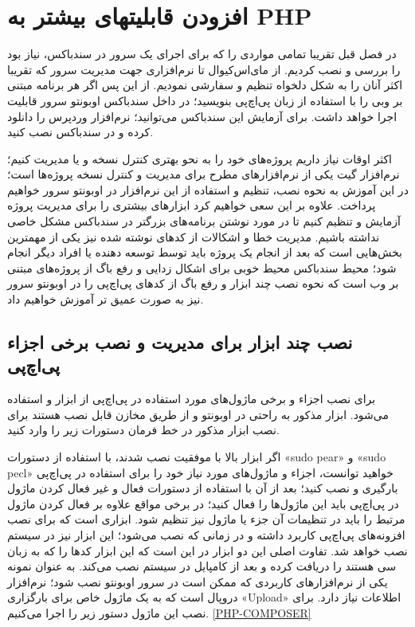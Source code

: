 \chapter{افزودن قابلیتهای بیشتر به PHP}
در فصل قبل تقریبا تمامی مواردی را که برای اجرای یک سرور در سندباکس، نیاز بود را بررسی و نصب کردیم. از مای‌اس‌کیوال تا نرم‌افزاری جهت مدیریت سرور که تقریبا اکثر آنان را به شکل دلخواه تنظیم و سفارشی نمودیم. از این پس اگر هر برنامه مبتنی بر وبی را با استفاده از زبان پی‌اچ‌پی بنویسید؛ در داخل سند‌باکس اوبونتو سرور قابلیت اجرا خواهد داشت. برای آزمایش این سندباکس می‌توانید؛ نرم‌افزار وردپرس را دانلود کرده و در سندباکس نصب کنید.

اکثر اوقات نیاز داریم پروژه‌های خود را به نحو بهتری کنترل نسخه و یا مدیریت کنیم؛ نرم‌افزار گیت یکی از نرم‌افزارهای مطرح برای مدیریت و کنترل نسخه پروژه‌ها است؛ در این آموزش به نحوه نصب، تنظیم و استفاده از این نرم‌افزار در اوبونتو سرور خواهیم پرداخت. علاوه بر این سعی خواهیم کرد ابزارهای بیشتری را برای مدیریت پروژه آزمایش و تنظیم کنیم تا در مورد نوشتن برنامه‌های بزرگتر در سندباکس مشکل خاصی نداشته باشیم. مدیریت خطا و اشکالات از کدهای نوشته شده نیز یکی از مهمترین بخش‌هایی است که بعد از انجام یک پروژه باید توسط توسعه دهنده یا افراد دیگر انجام شود؛ محیط سندباکس محیط خوبی برای اشکال زدایی و رفع باگ از پروژه‌های مبتنی بر وب است که نحوه نصب چند ابزار و رفع باگ از کدهای پی‌اچ‌پی را در اوبونتو سرور نیز به صورت عمیق تر آموزش خواهیم داد.
\section{نصب چند ابزار برای مدیریت و نصب برخی اجزاء پی‌اچ‌پی}
برای نصب اجزاء و برخی ماژول‌های مورد استفاده در پی‌اچ‌پی از ابزار 
 و 
  استفاده می‌شود.  ابزار مذکور به راحتی در اوبونتو و از طریق مخازن قابل نصب هستند برای نصب ابزار مذکور در خط فرمان دستورات زیر را وارد کنید.
\newline

\begin{latin}  
    
\end{latin}

اگر ابزار بالا با موفقیت نصب شدند، با استفاده از دستورات «sudo pear» و «sudo pecl» خواهید توانست، اجزاء و ماژو‌ل‌های مورد نیاز خود را برای استفاده در پی‌اچ‌پی بارگیری و نصب کنید؛ بعد از آن با استفاده از دستورات فعال و غیر فعال کردن ماژول در پی‌اچ‌پی باید این ماژول‌ها را فعال کنید؛ در برخی مواقع علاوه بر فعال کردن ماژول مرتبط را باید در تنظیمات 
آن جزء یا ماژول نیز تنظیم شود.
ابزاری است که برای نصب  افزونه‌های پی‌اچ‌پی کاربرد داشته و در زمانی که 
 نصب می‌شود؛ این ابزار نیز در سیستم نصب خواهد شد. تفاوت اصلی این دو ابزار در این است که این ابزار کدها را که به زبان سی هستند  را دریافت کرده  و بعد از کامپایل در سیستم نصب می‌کند. به عنوان نمونه یکی از نرم‌افزارهای کاربردی که ممکن است در سرور اوبونتو نصب شود؛ نرم‌افزار دروپال است که به یک ماژول خاص برای بارگزاری «Upload» اطلاعات نیاز دارد. برای نصب این ماژول دستور زیر را اجرا می‌کنیم. \ref{PHP-COMPOSER}


